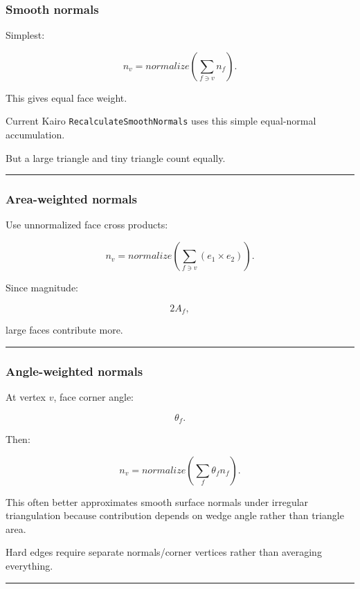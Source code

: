 \subsubsection{Smooth normals}\label{smooth-normals}

Simplest:

\[
n_v=
normalize
\left(
\sum_{f\ni v}
n_f
\right).
\]

This gives equal face weight.

Current Kairo \texttt{RecalculateSmoothNormals} uses this simple equal-normal accumulation.

But a large triangle and tiny triangle count equally.

\begin{center}\rule{0.5\linewidth}{0.5pt}\end{center}

\subsubsection{Area-weighted normals}\label{area-weighted-normals}

Use unnormalized face cross products:

\[
\boxed{
n_v
=
normalize
\left(
\sum_{f\ni v}
(e_1\times e_2)
\right).
}
\]

Since magnitude:

\[
2A_f,
\]

large faces contribute more.

\begin{center}\rule{0.5\linewidth}{0.5pt}\end{center}

\subsubsection{Angle-weighted normals}\label{angle-weighted-normals}

At vertex \(v\), face corner angle:

\[
\theta_f.
\]

Then:

\[
\boxed{
n_v=
normalize
\left(
\sum_f
\theta_fn_f
\right).
}
\]

This often better approximates smooth surface normals under irregular triangulation because contribution depends on wedge angle rather than triangle area.

Hard edges require separate normals/corner vertices rather than averaging everything.

\begin{center}\rule{0.5\linewidth}{0.5pt}\end{center}

